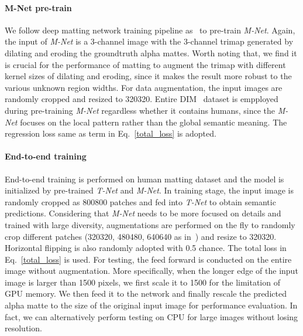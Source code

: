 \paragraph{\textbf{M-Net pre-train}} 
We follow deep matting network training pipeline as~\cite{xu2017deep} to pre-train \emph{M-Net}.
Again, the input of \emph{M-Net} is a 3-channel image with the 3-channel trimap generated by dilating and eroding the groundtruth alpha mattes.
Worth noting that, we find it is crucial for the performance of matting to augment the trimap with different kernel sizes of dilating and eroding, since it makes the result more robust to the various unknown region widths.
For data augmentation, the input images are randomly cropped and resized to 320320.
Entire DIM~\cite{xu2017deep} dataset is empployed during pre-training \emph{M-Net} regardless whether it contains humans, since the \emph{M-Net} focuses on the local pattern rather than the global semantic meaning.
The regression loss same as  term in Eq.~\ref{total_loss} is adopted.
   


\paragraph{\textbf{End-to-end training}}

End-to-end training is performed on human matting dataset and the model is initialized by pre-trained \emph{T-Net} and \emph{M-Net}.
In training stage, the input image is randomly cropped as 800800 patches and fed into \emph{T-Net} to obtain semantic predictions.
Considering that \emph{M-Net} needs to be more focused on details and trained with large diversity,
augmentations are performed on the fly to randomly crop different patches (320320, 480480, 640640 as in~\cite{xu2017deep}) and resize to 320320.
Horizontal flipping is also randomly adopted with 0.5 chance.
The total loss in Eq.~\ref{total_loss} is used.
For testing, the feed forward is conducted on the entire image without augmentation. More specifically, when the longer edge of the input image is larger than 1500 pixels, we first scale it to 1500 for the limitation of GPU memory. We then feed it to the network and finally rescale the predicted alpha matte to the size of the original input image for performance evaluation. In fact, we can alternatively perform testing on CPU for large images without losing resolution.


















